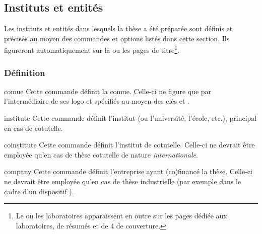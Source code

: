 \subsection{Instituts et entités}\label{sec-entites}

Les instituts et entités dans lesquels  la thèse
a été préparée sont définis et précisés au moyen des commandes et options
listés dans cette section. Ils figureront automatiquement sur la ou les pages
de titre\footnote{Le ou les laboratoires apparaissent en outre sur les pages
  dédiée aux laboratoires, de résumés et de 4\ieme{} de couverture.}.

\subsubsection{Définition}
%
\begin{docCommand}{comue}{}
  Cette commande définit la \gls{comue}. Celle-ci ne figure que par
  l'intermédiaire de ses logo et  spécifiés au moyen des clés
   et .
\end{docCommand}
%
\begin{docCommand}[doc description=\mandatory]{institute}{}
  Cette commande définit l'institut (ou l'université, l'école, etc.), principal
  en cas de cotutelle.
\end{docCommand}
%
\begin{docCommand}{coinstitute}{}
  Cette commande définit l'institut de cotutelle. Celle-ci ne
  devrait être employée qu'en cas de thèse cotutelle de nature
  \emph{internationale}.
\end{docCommand}
%
\begin{docCommand}{company}{}
  Cette commande définit l'entreprise ayant (co)financé la thèse.
  Celle-ci ne devrait être employée qu'en cas de thèse industrielle (par
  exemple dans le cadre d'un dispositif ).
\end{docCommand}
